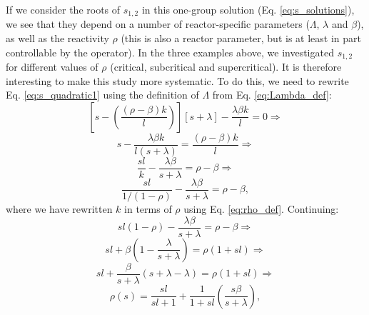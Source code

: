 If we consider the roots of $s_{1, 2}$ in this one-group solution (Eq. \ref{eq:s_solutions}), we see that they depend on a number of reactor-specific parameters ($\Lambda$, $\lambda$ and $\beta$), as well as the reactivity $\rho$ (this is also a reactor parameter, but is at least in part controllable by the operator). In the three examples above, we investigated $s_{1, 2}$ for different values of $\rho$ (critical, subcritical and supercritical). It is therefore interesting to make this study more systematic. To do this, we need to rewrite Eq. \ref{eq:s_quadratic1} using the definition of $\Lambda$ from Eq. \ref{eq:Lambda_def}:
\begin{equation}
	\left[ s - \left( \frac{(\rho - \beta)k}{l} \right) \right] [s+\lambda] - \frac{\lambda \beta k}{l} = 0 \Rightarrow
\end{equation}
\begin{equation}
	s - \frac{\lambda \beta k}{l(s+\lambda)} = \frac{(\rho - \beta)k}{l} \Rightarrow
\end{equation}
\begin{equation}
	\frac{sl}{k} - \frac{\lambda \beta}{s+\lambda} = \rho - \beta \Rightarrow
\end{equation}
\begin{equation}
	\frac{sl}{1/(1-\rho)} - \frac{\lambda \beta}{s+\lambda} = \rho - \beta,
\end{equation}
where we have rewritten $k$ in terms of $\rho$ using Eq. \ref{eq:rho_def}. Continuing:
\begin{equation}
	sl(1-\rho) - \frac{\lambda \beta}{s+\lambda} = \rho - \beta \Rightarrow
\end{equation}
\begin{equation}
	sl + \beta \left( 1 - \frac{\lambda}{s+\lambda}\right) = \rho(1 + sl) \Rightarrow
\end{equation}
\begin{equation}
	sl + \frac{\beta}{s+\lambda} ( s + \lambda - \lambda) = \rho(1 + sl) \Rightarrow
\end{equation}
\begin{equation}
	\rho(s) = \frac{sl}{sl + 1} + \frac{1}{1 + sl}\left(\frac{s\beta}{s+\lambda}\right),
\end{equation}
